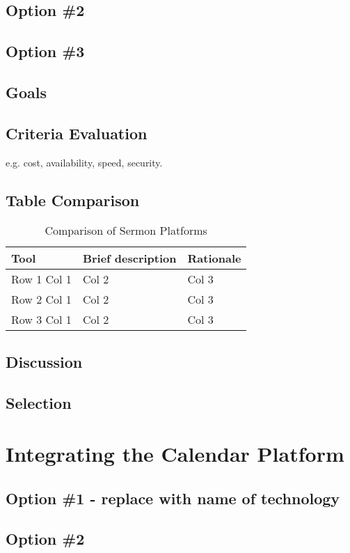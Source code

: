 \documentclass[letterpaper,10pt,draftclsnofoot,onecolumn,titlepage]{IEEEtran}
\begin{document}
	\subsection{Option \#2}
	\subsection{Option \#3}
	\subsection{Goals}
	\subsection{Criteria Evaluation}
	e.g. cost, availability, speed, security.
	\subsection{Table Comparison}
	\begin{table}[ht]
	\caption{Comparison of Sermon Platforms}
	\begin{center}
	\begin{tabular} { | m{3cm} | m{5cm} | m{5cm} | }
	\hline\hline
	Tool & Brief description & Rationale \\ [0.5ex]
	\hline
	Row 1 Col 1 & Col 2 & Col 3 \\
	\hline
	Row 2 Col 1 & Col 2 & Col 3 \\
	\hline
	Row 3 Col 1 & Col 2 & Col 3 \\
	\hline
	\end{tabular}
	\end{center}
	\end{table}
	\subsection{Discussion}
	\subsection{Selection}

	\section{Integrating the Calendar Platform}
	\subsection{Option \#1 - replace with name of technology}
	\subsection{Option \#2}
\end{document}

